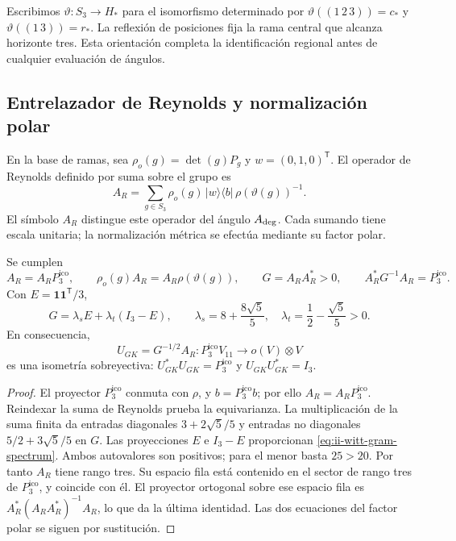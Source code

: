 Escribimos \(\vartheta:S_3\to H_*\) para el isomorfismo determinado
por \(\vartheta((1\,2\,3))=c_*\) y
\(\vartheta((1\,3))=r_*\). La reflexión de posiciones fija la rama
central que alcanza horizonte tres. Esta orientación completa la
identificación regional antes de cualquier evaluación de ángulos.

\subsection{Entrelazador de Reynolds y normalización polar}

En la base de ramas, sea \(\rho_o(g)=\det(g)P_g\) y
\(w=(0,1,0)^{\mathsf T}\). El operador de Reynolds definido por suma
sobre el grupo es
\begin{equation}
 A_R=\sum_{g\in S_3}\rho_o(g)\,|w\rangle\langle b|\,
                       \rho(\vartheta(g))^{-1}.
 \label{eq:ii-witt-reynolds}
\end{equation}
El símbolo \(A_R\) distingue este operador del ángulo
\(A_{\rm deg}\). Cada sumando tiene escala unitaria; la normalización
métrica se efectúa mediante su factor polar.

\begin{proposition}
\label{prop:ii-witt-polar}
Se cumplen
\[
 A_R=A_RP_3^{\mathrm{ico}},\qquad
 \rho_o(g)A_R=A_R\rho(\vartheta(g)),\qquad
 G=A_RA_R^*>0,\qquad A_R^*G^{-1}A_R=P_3^{\mathrm{ico}}.
\]
Con \(E=\mathbf1\mathbf1^{\mathsf T}/3\),
\begin{equation}
 G=\lambda_sE+\lambda_t(I_3-E),\qquad
 \lambda_s=8+\frac{8\sqrt5}{5},\quad
 \lambda_t=\frac12-\frac{\sqrt5}{5}>0.
 \label{eq:ii-witt-gram-spectrum}
\end{equation}
En consecuencia,
\[
 U_{GK}=G^{-1/2}A_R:P_3^{\mathrm{ico}}V_{11}\longrightarrow o(V)\otimes V
\]
es una isometría sobreyectiva:
\(U_{GK}^*U_{GK}=P_3^{\mathrm{ico}}\) y \(U_{GK}U_{GK}^*=I_3\).
\end{proposition}
\begin{proof}
El proyector \(P_3^{\mathrm{ico}}\) conmuta con \(\rho\), y \(b=P_3^{\mathrm{ico}}b\);
por ello \(A_R=A_RP_3^{\mathrm{ico}}\). Reindexar la suma de Reynolds prueba la
equivarianza. La multiplicación de la suma finita da entradas diagonales
\(3+2\sqrt5/5\) y entradas no diagonales
\(5/2+3\sqrt5/5\) en \(G\). Las proyecciones \(E\) e \(I_3-E\)
proporcionan \eqref{eq:ii-witt-gram-spectrum}. Ambos autovalores son
positivos; para el menor basta \(25>20\). Por tanto \(A_R\) tiene
rango tres. Su espacio fila está contenido en el sector de rango tres
de \(P_3^{\mathrm{ico}}\), y coincide con él. El proyector ortogonal sobre ese espacio
fila es \(A_R^*(A_RA_R^*)^{-1}A_R\), lo que da la última identidad.
Las dos ecuaciones del factor polar se siguen por sustitución.
\end{proof}

